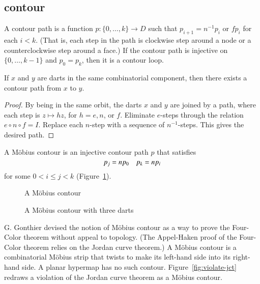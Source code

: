 \subsection{contour}

\begin{definition}  A contour path is a function $p:\{0,\ldots,k\}\to D$
such that $p_{i+1} =
n^{-1} p_i$ or $f p_i$ for each $i<k$.  (That is, each
step in the path is clockwise step around a node or a
counterclockwise step around a face.)   If the contour path
is injective on $\{0,\ldots,k-1\}$
and  $p_0 = p_k$, then it is a contour loop.
\end{definition}

\begin{lemma}  
If $x$ and $y$ are darts in the same combinatorial component, then there exists a contour path from $x$ to $y$.
\end{lemma}

\begin{proof} 
By being in the same orbit, the darts $x$ and $y$ are joined by a path, where each step is $z\mapsto h z$, for $h=e,n$, or $f$.  Eliminate $e$-steps through the relation $e\circ n\circ f = I$.   Replace each $n$-step with a sequence of $n^{-1}$-steps.  This gives the desired path.
\end{proof}

\begin{definition} A M\"obius contour is an
injective contour path $p$ that satisfies
    \begin{equation}
    \tlabel{eqn:mobius}
    p_j = n p_0\quad p_k = n p_i
    \end{equation}
for some $0 < i\le j< k$ (Figure~\ref{fig:mobius}).
\end{definition}

\begin{figure}[htb]
  \centering
  \caption{A M\"obius contour}
  \label{fig:mobius}
\end{figure}

\begin{figure}[htb]
  \centering
  \caption{A M\"obius contour with three darts}
  \label{fig:3m}
\end{figure}


\begin{remark}
G. Gonthier devised the notion of M\"obius contour
as a way to prove the Four-Color theorem without appeal
to topology.  (The Appel-Haken
proof of the Four-Color theorem relies on the Jordan
curve theorem.)  A M\"obius contour is a 
combinatorial M\"obius strip that
twists to make 
its left-hand side into
its right-hand side.  A planar hypermap has no such contour.  
Figure~\ref{fig:violate-jct}
redraws a violation of the Jordan curve theorem
as a M\"obius contour.   
\end{remark}

